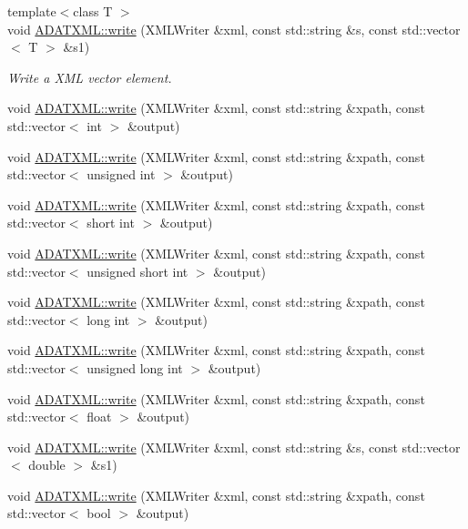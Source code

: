\begin{DoxyCompactItemize}
\item 
{\footnotesize template$<$class T $>$ }\\void \mbox{\hyperlink{group__io_gad6746caf2a4ff29e3ae8da748fd880a7}{A\+D\+A\+T\+X\+M\+L\+::write}} (X\+M\+L\+Writer \&xml, const std\+::string \&s, const std\+::vector$<$ T $>$ \&s1)
\begin{DoxyCompactList}\small\item\em Write a X\+ML vector element. \end{DoxyCompactList}\item 
void \mbox{\hyperlink{group__io_ga5f73c76144fce7c12dd53d0f785b2d05}{A\+D\+A\+T\+X\+M\+L\+::write}} (X\+M\+L\+Writer \&xml, const std\+::string \&xpath, const std\+::vector$<$ int $>$ \&output)
\item 
void \mbox{\hyperlink{group__io_ga763106f559ef609d54f89243e5965af4}{A\+D\+A\+T\+X\+M\+L\+::write}} (X\+M\+L\+Writer \&xml, const std\+::string \&xpath, const std\+::vector$<$ unsigned int $>$ \&output)
\item 
void \mbox{\hyperlink{group__io_ga9085d80500322f8f56b37df7c27cd61a}{A\+D\+A\+T\+X\+M\+L\+::write}} (X\+M\+L\+Writer \&xml, const std\+::string \&xpath, const std\+::vector$<$ short int $>$ \&output)
\item 
void \mbox{\hyperlink{group__io_gad9f57f8c23abf2a400ef501bb816e173}{A\+D\+A\+T\+X\+M\+L\+::write}} (X\+M\+L\+Writer \&xml, const std\+::string \&xpath, const std\+::vector$<$ unsigned short int $>$ \&output)
\item 
void \mbox{\hyperlink{group__io_ga402db05a61329b7bfeb8e92021f669c6}{A\+D\+A\+T\+X\+M\+L\+::write}} (X\+M\+L\+Writer \&xml, const std\+::string \&xpath, const std\+::vector$<$ long int $>$ \&output)
\item 
void \mbox{\hyperlink{group__io_gaddbbc6b8d1fa2d88b2b7d0ecd3e36884}{A\+D\+A\+T\+X\+M\+L\+::write}} (X\+M\+L\+Writer \&xml, const std\+::string \&xpath, const std\+::vector$<$ unsigned long int $>$ \&output)
\item 
void \mbox{\hyperlink{group__io_ga21089f03811e37a0d78c969c6a611f59}{A\+D\+A\+T\+X\+M\+L\+::write}} (X\+M\+L\+Writer \&xml, const std\+::string \&xpath, const std\+::vector$<$ float $>$ \&output)
\item 
void \mbox{\hyperlink{group__io_gab54b00e1a7cbc507061351d54d6de9fe}{A\+D\+A\+T\+X\+M\+L\+::write}} (X\+M\+L\+Writer \&xml, const std\+::string \&s, const std\+::vector$<$ double $>$ \&s1)
\item 
void \mbox{\hyperlink{group__io_ga5ca658ba9d302064625a4be34293839a}{A\+D\+A\+T\+X\+M\+L\+::write}} (X\+M\+L\+Writer \&xml, const std\+::string \&xpath, const std\+::vector$<$ bool $>$ \&output)

\end{DoxyCompactItemize}
